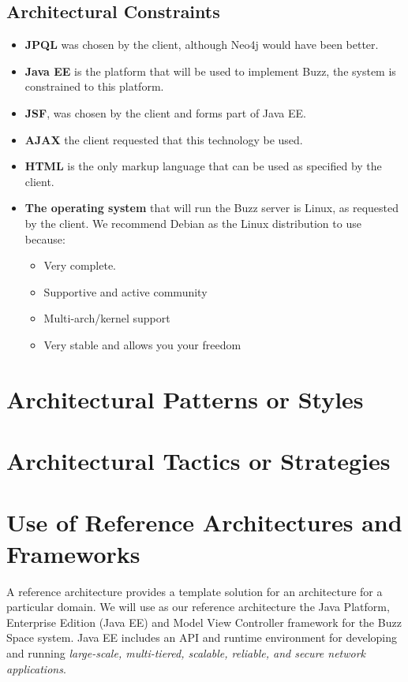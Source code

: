 \documentclass[a4paper,12pt,titlepage]{article}
\begin{document}
\subsection{Architectural Constraints}
	\begin{itemize}
		\item\textbf{JPQL} was chosen by the client, although Neo4j would have been better. 
		\item\textbf{Java EE} is the platform that will be used to implement Buzz, the system is constrained to this platform.
		\item\textbf{JSF}, was chosen by the client and forms part of Java EE. 
		\item\textbf{AJAX} the client requested that this technology be used. 
		\item\textbf{HTML} is the only markup language that can be used as specified by the client.
		\item\textbf{The operating system} that will run the Buzz server is Linux, as requested by the client. We recommend Debian as the Linux distribution to use because:  
		\begin{itemize}
			\item Very complete.
			\item Supportive and active community 
			\item Multi-arch/kernel support
			\item Very stable and allows you your freedom
		\end{itemize}
		\end{itemize}
\newpage
\section{Architectural Patterns or Styles}%

\newpage
\section{Architectural Tactics or Strategies}%
	
\newpage
\section{Use of Reference Architectures and Frameworks}%
A reference architecture provides a template solution for an architecture for a particular domain. We will use as our reference architecture the Java Platform, Enterprise Edition (Java EE) and Model View Controller framework for the Buzz Space system. 
Java EE includes an API and runtime environment for developing and running \textit{large-scale, multi-tiered, scalable, reliable, and secure network applications}.
\end{document}
